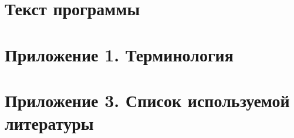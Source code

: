 \documentclass[
encoding=utf8
]{../twoeskd}
\begin{document}

% 

\newpage
{}
\tableofcontents

\newpage
\section{Текст программы}


\newpage
\section{Приложение 1. Терминология}


\newpage
\section{Приложение 3. Список используемой литературы}


\newpage
\eskdListOfChanges

\end{document}
